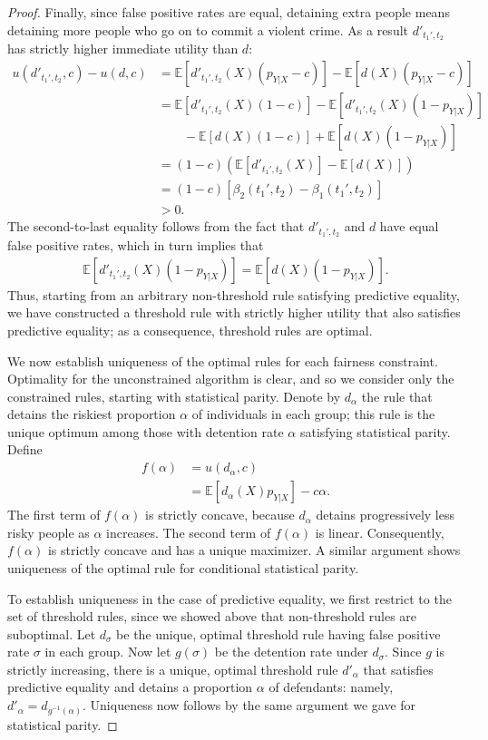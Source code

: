 \documentclass[sigconf]{acmart}
\newcommand{\EE}{\mathbb{E}}
\begin{document}
\begin{proof}
Finally, since false positive rates are equal, detaining extra people means detaining more people who go on to commit a violent crime. As a result 
$d'_{t_1',t_2}$ has strictly higher immediate utility than $d$:
\begin{align*}
u(d'_{t_1',t_2},c)-u(d,c)
& =\EE \left[d'_{t_1',t_2}(X)(p_{Y|X} - c)\right] -  \EE \left[d(X)(p_{Y|X} - c)\right] \\
&= \EE \left[d'_{t_1',t_2}(X)(1 - c)\right] - \EE \left[d'_{t_1',t_2}(X)(1 - p_{Y|X})\right]  \\
&\qquad - \EE \left[d(X)(1 - c)\right] + \EE \left[d(X)(1 - p_{Y|X})\right]\\
&= (1-c)\left( \EE \left[d'_{t_1',t_2}(X)\right]-\EE \left[d(X)\right]\right)\\
&= (1-c)\left[\beta_2(t_1',t_2)-\beta_1(t_1',t_2)\right]\\
&>0.
\end{align*}
The second-to-last equality follows from the fact that
$d'_{t_1',t_2}$ and $d$ have equal false positive rates, which
in turn implies that
\begin{align*}
\EE \left[d'_{t_1',t_2}(X)(1 - p_{Y|X} )\right]  =  \EE \left[d(X)(1 - p_{Y|X} )\right].
\end{align*}
Thus, starting from an arbitrary non-threshold rule satisfying predictive equality, 
we have constructed a threshold rule with strictly higher utility that also satisfies predictive equality; as a consequence, threshold rules are optimal.

We now establish uniqueness of the optimal rules for each fairness constraint.
Optimality for the unconstrained algorithm is clear, and so we consider only the constrained rules, starting with statistical parity.
Denote by $d_\alpha$ the rule that detains the riskiest proportion $\alpha$ of individuals in each group; this rule is the unique 
optimum among those with detention rate $\alpha$ satisfying statistical parity. Define 
\begin{align*}
f(\alpha) &= u(d_\alpha, c) \\
&= \EE \left[d_\alpha(X)p_{Y|X}\right] - c \alpha.
\end{align*}
The first term of $f(\alpha)$ is strictly concave, because 
$d_\alpha$ detains progressively less risky people as $\alpha$ increases. The second term of $f(\alpha)$ is linear. Consequently, $f(\alpha)$ is strictly concave and has a unique maximizer. 
A similar argument shows uniqueness of the optimal rule for conditional statistical parity.

To establish uniqueness in the case of predictive equality, 
we first restrict to the set of threshold rules, 
since we showed above that non-threshold rules are suboptimal.
Let $d_{\sigma}$ be the unique, optimal threshold rule having false positive rate $\sigma$ in each group.
Now let $g(\sigma)$ be the detention rate under $d_{\sigma}$.
Since $g$ is strictly increasing, there is 
a unique, optimal threshold rule $d'_{\alpha}$ that satisfies predictive equality and detains a proportion $\alpha$ of defendants:
namely, $d'_{\alpha} = d_{g^{-1}(\alpha)}$.
Uniqueness now follows by the same argument we gave for statistical parity.
\end{proof}
\end{document}
